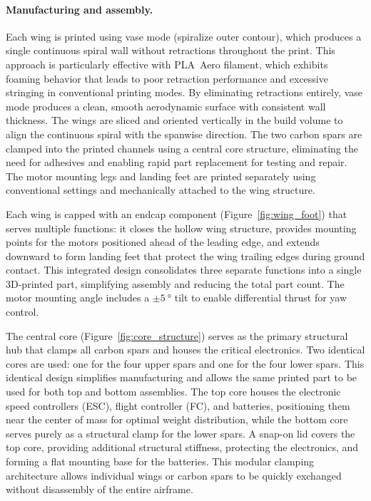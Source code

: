 \paragraph{Manufacturing and assembly.}
Each wing is printed using vase mode (spiralize outer contour), which produces a single continuous spiral wall without retractions throughout the print.
This approach is particularly effective with PLA~Aero filament, which exhibits foaming behavior that leads to poor retraction performance and excessive stringing in conventional printing modes.
By eliminating retractions entirely, vase mode produces a clean, smooth aerodynamic surface with consistent wall thickness.
The wings are sliced and oriented vertically in the build volume to align the continuous spiral with the spanwise direction.
The two carbon spars are clamped into the printed channels using a central core structure, eliminating the need for adhesives and enabling rapid part replacement for testing and repair.
The motor mounting legs and landing feet are printed separately using conventional settings and mechanically attached to the wing structure.

Each wing is capped with an endcap component (Figure~\ref{fig:wing_foot}) that serves multiple functions: it closes the hollow wing structure, provides mounting points for the motors positioned ahead of the leading edge, and extends downward to form landing feet that protect the wing trailing edges during ground contact.
This integrated design consolidates three separate functions into a single 3D-printed part, simplifying assembly and reducing the total part count.
The motor mounting angle includes a \(\pm\SI{5}{\degree}\) tilt to enable differential thrust for yaw control.

The central core (Figure~\ref{fig:core_structure}) serves as the primary structural hub that clamps all carbon spars and houses the critical electronics.
Two identical cores are used: one for the four upper spars and one for the four lower spars.
This identical design simplifies manufacturing and allows the same printed part to be used for both top and bottom assemblies.
The top core houses the electronic speed controllers (ESC), flight controller (FC), and batteries, positioning them near the center of mass for optimal weight distribution, while the bottom core serves purely as a structural clamp for the lower spars.
A snap-on lid covers the top core, providing additional structural stiffness, protecting the electronics, and forming a flat mounting base for the batteries.
This modular clamping architecture allows individual wings or carbon spars to be quickly exchanged without disassembly of the entire airframe.

